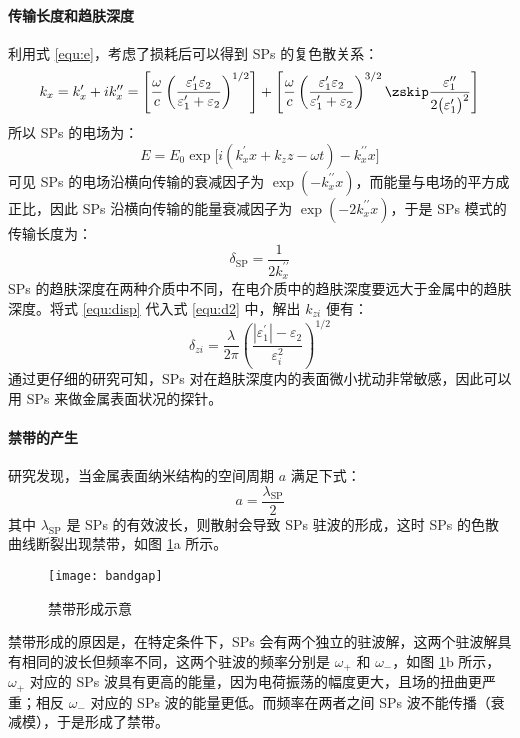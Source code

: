\paragraph{传输长度和趋肤深度}
利用式 \ref{equ:e}，考虑了损耗后可以得到 SPs 的复色散关系：
\begin{equation}
\label{equ:cdisp}
k_x = k_x^{\prime}+ik_x^{\prime\prime}= \left[\dfrac{\omega}{c}\left(\dfrac{\varepsilon_1^{\prime}\varepsilon_2}{\varepsilon_1^{\prime}+\varepsilon_2}\right)^{1/2}\right]+\left[\dfrac{\omega}{c}\left(\dfrac{\varepsilon_1^{\prime}\varepsilon_2}{\varepsilon_1^{\prime}+\varepsilon_2}\right)^{3/2}\zskip\dfrac{\varepsilon_1^{\prime\prime}}{2\big(\varepsilon_1^{\prime}\big)^2}\right]
\end{equation}
所以 SPs 的电场为：
\[
	E = E_0\exp\big[i(k_x^{\prime}x+k_zz-\omega t)-k_x^{\prime\prime}x\big]
\]
可见 SPs 的电场沿横向传输的衰减因子为 $\exp(-k_x^{\prime\prime}x)$，而能量与电场的平方成正比，因此 SPs 沿横向传输的能量衰减因子为 $\exp(-2k_x^{\prime\prime}x)$，于是 SPs 模式的传输长度为：
\begin{equation}
\label{equ:l}
\delta_{\text{SP}} = \dfrac{1}{2k_x^{\prime\prime}}
\end{equation}
SPs 的趋肤深度在两种介质中不同，在电介质中的趋肤深度要远大于金属中的趋肤深度。将式 \ref{equ:disp} 代入式 \ref{equ:d2} 中，解出 $k_{zi}$ 便有：
\begin{equation}
\label{equ:z}
\delta_{zi} = \dfrac{\lambda}{2\pi}\left(\dfrac{|\varepsilon_1^{\prime}|-\varepsilon_2}{\varepsilon_i^2}\right)^{1/2}
\end{equation}
通过更仔细的研究可知，SPs 对在趋肤深度内的表面微小扰动非常敏感，因此可以用 SPs 来做金属表面状况的探针。

\paragraph{禁带的产生}
研究发现，当金属表面纳米结构的空间周期 $a$ 满足下式：
\[
	a = \dfrac{\lambda_{\text{SP}}}{2}
\]
其中 $\lambda_{\text{SP}}$ 是 SPs 的有效波长，则散射会导致 SPs 驻波的形成，这时 SPs 的色散曲线断裂出现禁带，如图 \ref{fig:bg}a 所示。

\begin{figure}[htbp]
\centering
\texttt{[image: bandgap]}
\caption{\label{fig:bg}禁带形成示意}
\end{figure}

禁带形成的原因是，在特定条件下，SPs 会有两个独立的驻波解，这两个驻波解具有相同的波长但频率不同，这两个驻波的频率分别是 $\omega_+$ 和 $\omega_-$，如图 \ref{fig:bg}b 所示，$\omega_+$ 对应的 SPs 波具有更高的能量，因为电荷振荡的幅度更大，且场的扭曲更严重；相反 $\omega_-$ 对应的 SPs 波的能量更低。而频率在两者之间 SPs 波不能传播（衰减模），于是形成了禁带。

